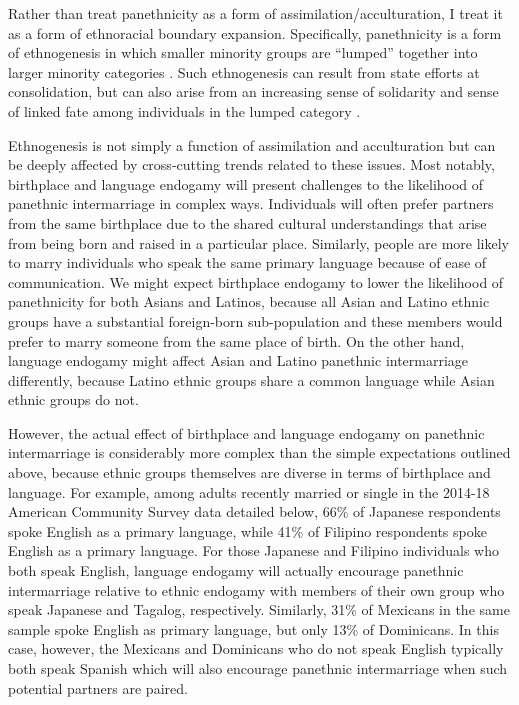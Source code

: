 \documentclass[11pt,]{article}
\begin{document}
Rather than treat panethnicity as a form of assimilation/acculturation, I treat it as a form of ethnoracial boundary expansion. Specifically, panethnicity is a form of ethnogenesis in which smaller minority groups are ``lumped'' together into larger minority categories \citep{kibria_construction_1997, wimmer_elementary_2008}. Such ethnogenesis can result from state efforts at consolidation, but can also arise from an increasing sense of solidarity and sense of linked fate among individuals in the lumped category \citep{wimmer_elementary_2008, okamoto_panethnicity_2014a}.

Ethnogenesis is not simply a function of assimilation and acculturation but can be deeply affected by cross-cutting trends related to these issues. Most notably, birthplace and language endogamy will present challenges to the likelihood of panethnic intermarriage in complex ways. Individuals will often prefer partners from the same birthplace due to the shared cultural understandings that arise from being born and raised in a particular place. Similarly, people are more likely to marry individuals who speak the same primary language because of ease of communication. We might expect birthplace endogamy to lower the likelihood of panethnicity for both Asians and Latinos, because all Asian and Latino ethnic groups have a substantial foreign-born sub-population and these members would prefer to marry someone from the same place of birth. On the other hand, language endogamy might affect Asian and Latino panethnic intermarriage differently, because Latino ethnic groups share a common language while Asian ethnic groups do not.

However, the actual effect of birthplace and language endogamy on panethnic intermarriage is considerably more complex than the simple expectations outlined above, because ethnic groups themselves are diverse in terms of birthplace and language. For example, among adults recently married or single in the 2014-18 American Community Survey data detailed below, 66\% of Japanese respondents spoke English as a primary language, while 41\% of Filipino respondents spoke English as a primary language. For those Japanese and Filipino individuals who both speak English, language endogamy will actually encourage panethnic intermarriage relative to ethnic endogamy with members of their own group who speak Japanese and Tagalog, respectively. Similarly, 31\% of Mexicans in the same sample spoke English as primary language, but only 13\% of Dominicans. In this case, however, the Mexicans and Dominicans who do not speak English typically both speak Spanish which will also encourage panethnic intermarriage when such potential partners are paired.
\end{document}
